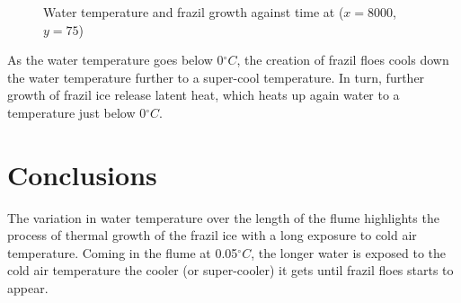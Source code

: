 \begin{figure}[H]
    \begin{center}
    \end{center}
    \caption{Water temperature and frazil growth against time at ($x=8000$, $y=75$)}
    \label{fig:growth_Cf_timeseries}
\end{figure}

As the water temperature goes below 0$^\circ C$, the creation of frazil floes cools down the water temperature further to a super-cool temperature. In turn, further growth of frazil ice release latent heat, which heats up again water to a temperature just below 0$^\circ C$.

\section{Conclusions}

The variation in water temperature over the length of the flume highlights the process of thermal growth of the frazil ice with a long exposure to cold air temperature. Coming in the flume at 0.05$^\circ C$, the longer water is exposed to the cold air temperature the cooler (or super-cooler) it gets until frazil floes starts to appear.

%
%
%
%
%
%


\renewcommand{\labelitemi}{\textbullet}
